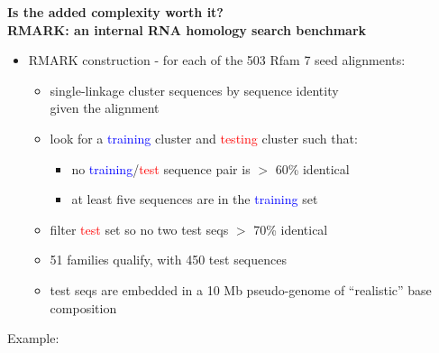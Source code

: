 \documentclass[landscape]{slides}
\begin{document}
\begin{slide}
\begin{center}
\textbf{Is the added complexity worth it? \\
  RMARK: an internal RNA homology search benchmark}
\end{center}
\medskip
\begin{minipage}{7in}
\small
\begin{itemize}
\item
  RMARK construction - for each of the 503 Rfam 7 seed alignments:
  \begin{itemize}
  \item 
    single-linkage cluster sequences by sequence identity \\ given the alignment
  \item 
    look for a \textcolor{blue}{training} cluster and
    \textcolor{red}{testing} cluster such that: 
    \begin{itemize}
    \item
      no \textcolor{blue}{training}/\textcolor{red}{test} sequence pair is $>$ 60\% identical
    \item
      at least five sequences are in the \textcolor{blue}{training} set
    \end{itemize}
  \item
    filter \textcolor{red}{test} set so no two test seqs $>$ 70\% identical 
  \item
    51 families qualify, with 450 test sequences
  \item
    test seqs are embedded in a 10 Mb pseudo-genome of ``realistic'' base composition
  \end{itemize}
\end{itemize}
\vspace{1.5in}
\end{minipage}
\hspace{0.1in}
\begin{minipage}{3.5in}
  Example: 
\vspace{0.2in}


\end{minipage}
\end{slide}
\end{document}

